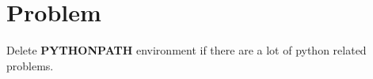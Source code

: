 
\chapter{Problem}

Delete \textbf{PYTHONPATH} environment if there are a lot of python related problems.